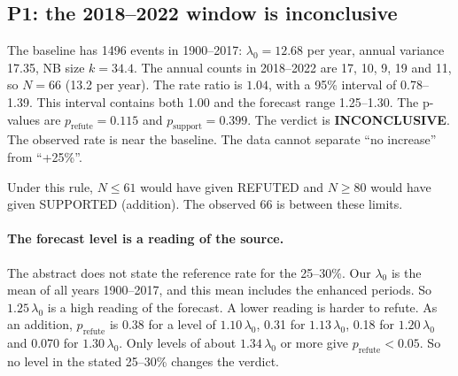 \documentclass[11pt]{article}
\begin{document}
\subsection{P1: the 2018--2022 window is inconclusive}
The baseline has 1496 events in 1900--2017: $\lambda_0 = 12.68$ per year, annual variance 17.35, NB size $k = 34.4$. The annual counts in 2018--2022 are 17, 10, 9, 19 and 11, so $N = 66$ (13.2 per year). The rate ratio is $1.04$, with a 95\% interval of 0.78--1.39. This interval contains both 1.00 and the forecast range 1.25--1.30. The p-values are $p_{\text{refute}} = 0.115$ and $p_{\text{support}} = 0.399$. The verdict is \textbf{INCONCLUSIVE}. The observed rate is near the baseline. The data cannot separate ``no increase'' from ``+25\%''.

Under this rule, $N \le 61$ would have given REFUTED and $N \ge 80$ would have given SUPPORTED (addition). The observed 66 is between these limits.

\paragraph{The forecast level is a reading of the source.} The abstract does not state the reference rate for the 25--30\%. Our $\lambda_0$ is the mean of all years 1900--2017, and this mean includes the enhanced periods. So $1.25\,\lambda_0$ is a high reading of the forecast. A lower reading is harder to refute. As an addition, $p_{\text{refute}}$ is 0.38 for a level of $1.10\,\lambda_0$, 0.31 for $1.13\,\lambda_0$, 0.18 for $1.20\,\lambda_0$ and 0.070 for $1.30\,\lambda_0$. Only levels of about $1.34\,\lambda_0$ or more give $p_{\text{refute}} < 0.05$. So no level in the stated 25--30\% changes the verdict.
\end{document}
